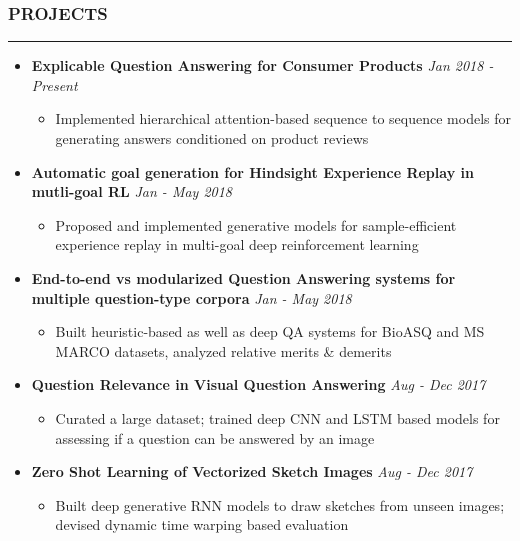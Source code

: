 \documentclass[10pt,a4paper,English]{article}
\newcommand\roottitle[1]{\vspace{-4mm}\subsubsection*{\uppercase{#1}}\vspace{-0.3em}\nopagebreak[4]\hrule\vspace{4mm}}
\newcommand\itemyear[1]{\hfill \emph{\color{itemyear} #1}}
\newcommand\itemenv{\setlength\itemsep{0.5pt} \addtolength{\itemindent}{-5mm}\vspace{-1.5mm}}
\begin{document}
\roottitle{Projects}
\begin{itemize} \itemenv
    \item \textbf{Explicable Question Answering for Consumer Products}\itemyear{Jan 2018 - Present}
        \begin{itemize} \itemenv
            \item Implemented hierarchical attention-based sequence to sequence models for generating answers conditioned on product reviews
        \end{itemize}
    
    \item \textbf{Automatic goal generation for Hindsight Experience Replay in mutli-goal RL}\itemyear{Jan - May 2018}
        \begin{itemize} \itemenv
            \item Proposed and implemented generative models for sample-efficient experience replay in multi-goal deep reinforcement learning
        \end{itemize}

    \item \textbf{End-to-end vs modularized Question Answering systems for multiple question-type corpora}\itemyear{Jan - May 2018}
        \begin{itemize} \itemenv
            \item Built heuristic-based as well as deep QA systems for BioASQ and MS MARCO datasets, analyzed relative merits \& demerits
        \end{itemize}
        
    \item \textbf{Question Relevance in Visual Question Answering}\itemyear{Aug - Dec 2017}
        \begin{itemize} \itemenv
            \item Curated a large dataset; trained deep CNN and LSTM based models for assessing if a question can be answered by an image
        \end{itemize}

    \item \textbf{Zero Shot Learning of Vectorized Sketch Images}\itemyear{Aug - Dec 2017}
        \begin{itemize} \itemenv
            \item Built deep generative RNN models to draw sketches from unseen images; devised dynamic time warping based evaluation
        \end{itemize}


\end{itemize}
\end{document}
